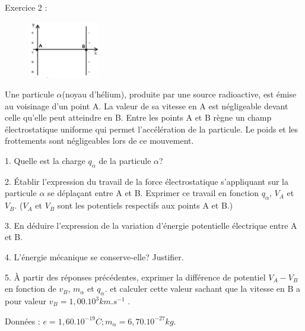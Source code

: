 \documentclass[12pt, french]{article}
\begin{document}
\begin{Box2}{Exercice 2 : }
\begin{figure}
  \begin{center}
    \includegraphics[width=0.28\textwidth]{./img/img_00.png}
  \end{center}
\end{figure}




Une particule $\alpha$(noyau d'hélium), produite par une source radioactive, est émise au voisinage d'un point A. La
valeur de sa vitesse en A est négligeable devant celle qu'elle peut atteindre en B.
Entre les points A et B règne un champ électrostatique uniforme qui permet l'accélération de la particule. Le poids et les frottements sont négligeables lors de ce mouvement.

   1. Quelle est la charge $q_\alpha$ de la particule $\alpha$?

   2. Établir l'expression du travail de la force électrostatique s'appliquant sur la
particule $\alpha$ se déplaçant entre A et B. Exprimer ce travail en fonction $q_\alpha$, $V_A$ et $V_B$.
($V_A$ et $V_B$ sont les potentiels respectifs aux points A et B.)

3. En déduire l'expression de la variation d'énergie potentielle électrique entre A et B.

 4. L'énergie mécanique se conserve-elle? Justifier.

5. À partir des réponses précédentes, exprimer la différence de potentiel $V_A - V_B$ en fonction de $v_B$, $m_\alpha$ et $q_\alpha$.
   et calculer cette valeur sachant que la vitesse en B a pour valeur $v_B = 1,00 . 10^3 km.s^{-1}$
.

   Données : $e = 1,60 . 10^{-19} C; m_\alpha= 6,70 . 10^{-27} kg$.
\end{Box2}
\end{document}
